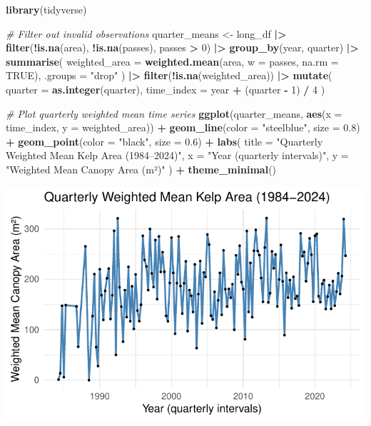 \documentclass[
  british,
  10pt,
]{article}
\newenvironment{Shaded}{\begin{snugshade}}{\end{snugshade}}
\newcommand{\AttributeTok}[1]{\textcolor[rgb]{0.13,0.29,0.53}{#1}}
\newcommand{\CommentTok}[1]{\textcolor[rgb]{0.56,0.35,0.01}{\textit{#1}}}
\newcommand{\ConstantTok}[1]{\textcolor[rgb]{0.56,0.35,0.01}{#1}}
\newcommand{\DecValTok}[1]{\textcolor[rgb]{0.00,0.00,0.81}{#1}}
\newcommand{\FloatTok}[1]{\textcolor[rgb]{0.00,0.00,0.81}{#1}}
\newcommand{\FunctionTok}[1]{\textcolor[rgb]{0.13,0.29,0.53}{\textbf{#1}}}
\newcommand{\NormalTok}[1]{#1}
\newcommand{\OtherTok}[1]{\textcolor[rgb]{0.56,0.35,0.01}{#1}}
\newcommand{\SpecialCharTok}[1]{\textcolor[rgb]{0.81,0.36,0.00}{\textbf{#1}}}
\newcommand{\StringTok}[1]{\textcolor[rgb]{0.31,0.60,0.02}{#1}}
\begin{document}
\begin{Shaded}
\begin{Highlighting}[]
\FunctionTok{library}\NormalTok{(tidyverse)}

\CommentTok{\# Filter out invalid observations}
\NormalTok{quarter\_means }\OtherTok{\textless{}{-}}\NormalTok{ long\_df }\SpecialCharTok{|\textgreater{}} 
  \FunctionTok{filter}\NormalTok{(}\SpecialCharTok{!}\FunctionTok{is.na}\NormalTok{(area), }\SpecialCharTok{!}\FunctionTok{is.na}\NormalTok{(passes), passes }\SpecialCharTok{\textgreater{}} \DecValTok{0}\NormalTok{) }\SpecialCharTok{|\textgreater{}} 
  \FunctionTok{group\_by}\NormalTok{(year, quarter) }\SpecialCharTok{|\textgreater{}} 
  \FunctionTok{summarise}\NormalTok{(}
    \AttributeTok{weighted\_area =} \FunctionTok{weighted.mean}\NormalTok{(area, }\AttributeTok{w =}\NormalTok{ passes, }\AttributeTok{na.rm =} \ConstantTok{TRUE}\NormalTok{),}
    \AttributeTok{.groups =} \StringTok{"drop"}
\NormalTok{  ) }\SpecialCharTok{|\textgreater{}} 
  \FunctionTok{filter}\NormalTok{(}\SpecialCharTok{!}\FunctionTok{is.na}\NormalTok{(weighted\_area)) }\SpecialCharTok{|\textgreater{}} 
  \FunctionTok{mutate}\NormalTok{(}
    \AttributeTok{quarter =} \FunctionTok{as.integer}\NormalTok{(quarter),}
    \AttributeTok{time\_index =}\NormalTok{ year }\SpecialCharTok{+}\NormalTok{ (quarter }\SpecialCharTok{{-}} \DecValTok{1}\NormalTok{) }\SpecialCharTok{/} \DecValTok{4}
\NormalTok{  )}

\CommentTok{\# Plot quarterly weighted mean time series}
\FunctionTok{ggplot}\NormalTok{(quarter\_means, }\FunctionTok{aes}\NormalTok{(}\AttributeTok{x =}\NormalTok{ time\_index, }\AttributeTok{y =}\NormalTok{ weighted\_area)) }\SpecialCharTok{+}
  \FunctionTok{geom\_line}\NormalTok{(}\AttributeTok{color =} \StringTok{"steelblue"}\NormalTok{, }\AttributeTok{size =} \FloatTok{0.8}\NormalTok{) }\SpecialCharTok{+}
  \FunctionTok{geom\_point}\NormalTok{(}\AttributeTok{color =} \StringTok{"black"}\NormalTok{, }\AttributeTok{size =} \FloatTok{0.6}\NormalTok{) }\SpecialCharTok{+}
  \FunctionTok{labs}\NormalTok{(}
    \AttributeTok{title =} \StringTok{"Quarterly Weighted Mean Kelp Area (1984–2024)"}\NormalTok{,}
    \AttributeTok{x =} \StringTok{"Year (quarterly intervals)"}\NormalTok{,}
    \AttributeTok{y =} \StringTok{"Weighted Mean Canopy Area (m²)"}
\NormalTok{  ) }\SpecialCharTok{+}
  \FunctionTok{theme\_minimal}\NormalTok{()}
\end{Highlighting}
\end{Shaded}

\begin{center}
\includegraphics[width=0.6\linewidth,height=\textheight,keepaspectratio]{BCB744_Biostats_Prac_Exam_2025_files/figure-pdf/chunk6-1.pdf}
\end{center}
\end{document}
